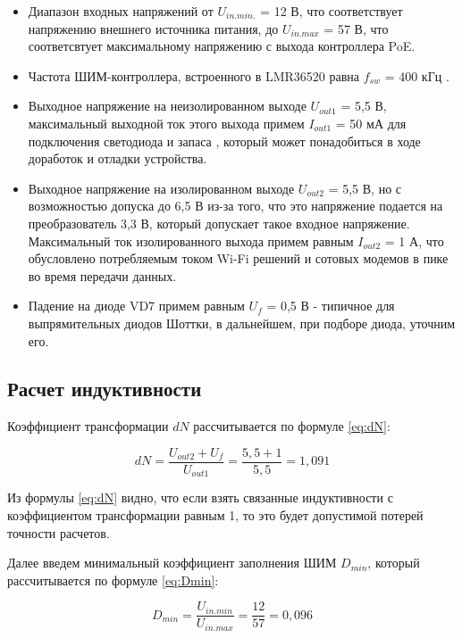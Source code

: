 \begin{itemize}
    \item Диапазон входных напряжений от $U_{in.min.}$ = 12 В, что соответствует напряжению
    внешнего источника питания, до $U_{in.max}$ = 57 В, что соответсвтует максимальному
    напряжению с выхода контроллера PoE. 
    \item Частота ШИМ-контроллера, встроенного в LMR36520 равна $f_{sw}$ = 400 кГц 
    \cite{LMR36520:datasheet}. 
    \item Выходное напряжение на неизолированном выходе $U_{out1}$ = 5,5 В, максимальный 
    выходной ток этого выхода примем $I_{out1}$ = 50 мА для подключения светодиода и запаса 
    , который может понадобиться в ходе доработок и отладки устройства. 
    \item Выходное напряжение на изолированном выходе $U_{out2}$ = 5,5 В, но с возможностью допуска
    до 6,5 В из-за того, что это напряжение подается на преобразователь 3,3 В, который допускает 
    такое входное напряжение. Максимальный ток изолированного выхода примем равным $I_{out2}$ = 1 А,
    что обусловлено потребляемым током Wi-Fi решений и сотовых модемов в пике во время передачи 
    данных. 
    \item Падение на диоде VD7 примем равным $U_{f}$ = 0,5 В - типичное для выпрямительных диодов Шоттки, 
    в дальнейшем, при подборе диода, уточним его.
    
\end{itemize}

\subsection{Расчет индуктивности}
\hspace{1cm} 

Коэффициент трансформации $dN$ рассчитывается по формуле \ref{eq:dN}:

\begin{equation}
    dN = \frac{U_{out2} + U_{f}}{ U_{out1}} = \frac{5,5 + 1}{5,5} = 1,091
    \label{eq:dN}
\end{equation}

Из формулы \ref{eq:dN} видно, что если взять связанные индуктивности с коэффициентом 
трансформации равным 1, то это будет допустимой потерей точности расчетов. 

Далее введем минимальный коэффициент заполнения ШИМ $D_{min}$, который рассчитывается по 
формуле \ref{eq:Dmin}:

\begin{equation}
    D_{min} = \frac{U_{in.min}}{U_{in.max}} = \frac{12}{57} = 0,096
    \label{eq:Dmin}
\end{equation}


